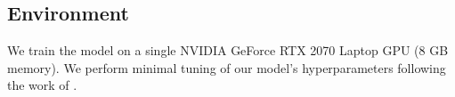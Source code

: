 \subsection{Environment}
We train the model on a single NVIDIA GeForce RTX 2070 Laptop GPU (8 GB memory). We perform minimal tuning of our model's hyperparameters following the work of .

